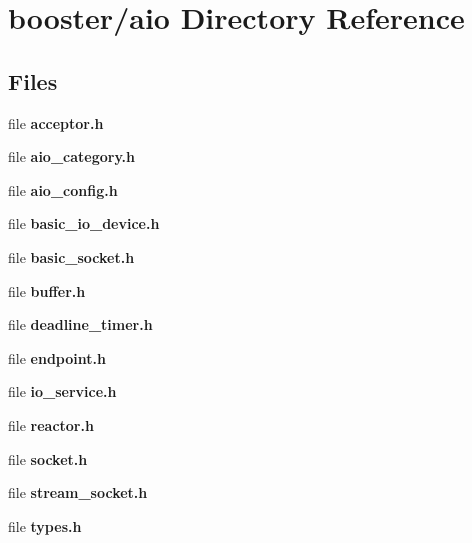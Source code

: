 \section{booster/aio Directory Reference}
\label{dir_6df79130e9ea9b93fd189f47c11fe376}
\subsection*{Files}
\begin{DoxyCompactItemize}
\item 
file {\bfseries acceptor.\-h}
\item 
file {\bfseries aio\-\_\-category.\-h}
\item 
file {\bfseries aio\-\_\-config.\-h}
\item 
file {\bfseries basic\-\_\-io\-\_\-device.\-h}
\item 
file {\bfseries basic\-\_\-socket.\-h}
\item 
file {\bfseries buffer.\-h}
\item 
file {\bfseries deadline\-\_\-timer.\-h}
\item 
file {\bfseries endpoint.\-h}
\item 
file {\bfseries io\-\_\-service.\-h}
\item 
file {\bfseries reactor.\-h}
\item 
file {\bfseries socket.\-h}
\item 
file {\bfseries stream\-\_\-socket.\-h}
\item 
file {\bfseries types.\-h}
\end{DoxyCompactItemize}
